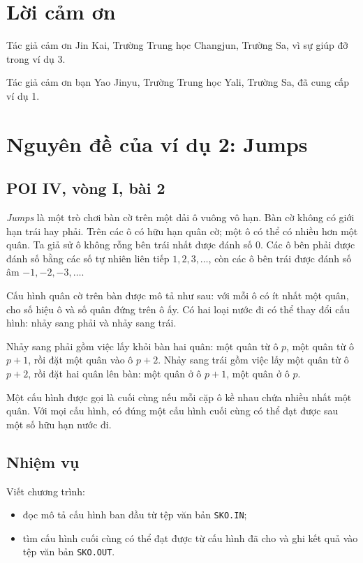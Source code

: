 \documentclass[11pt]{article}
\begin{document}
\section*{Lời cảm ơn}

Tác giả cảm ơn Jin Kai, Trường Trung học Changjun, Trường Sa, vì sự giúp đỡ
trong ví dụ 3.

Tác giả cảm ơn bạn Yao Jinyu, Trường Trung học Yali, Trường Sa, đã cung cấp
ví dụ 1.

\appendix
\section{Nguyên đề của ví dụ 2: Jumps}

\subsection*{POI IV, vòng I, bài 2}

\textit{Jumps} là một trò chơi bàn cờ trên một dải ô vuông vô hạn. Bàn cờ
không có giới hạn trái hay phải. Trên các ô có hữu hạn quân cờ; một ô có thể
có nhiều hơn một quân. Ta giả sử ô không rỗng bên trái nhất được đánh số
\(0\). Các ô bên phải được đánh số bằng các số tự nhiên liên tiếp
\(1,2,3,\ldots\), còn các ô bên trái được đánh số âm
\(-1,-2,-3,\ldots\).

Cấu hình quân cờ trên bàn được mô tả như sau: với mỗi ô có ít nhất một quân,
cho số hiệu ô và số quân đứng trên ô ấy. Có hai loại nước đi có thể thay đổi
cấu hình: nhảy sang phải và nhảy sang trái.

Nhảy sang phải gồm việc lấy khỏi bàn hai quân: một quân từ ô \(p\), một quân
từ ô \(p+1\), rồi đặt một quân vào ô \(p+2\). Nhảy sang trái gồm việc lấy một
quân từ ô \(p+2\), rồi đặt hai quân lên bàn: một quân ở ô \(p+1\), một quân ở
ô \(p\).

Một cấu hình được gọi là cuối cùng nếu mỗi cặp ô kề nhau chứa nhiều nhất một
quân. Với mọi cấu hình, có đúng một cấu hình cuối cùng có thể đạt được sau một
số hữu hạn nước đi.

\subsection*{Nhiệm vụ}

Viết chương trình:
\begin{itemize}
  \item đọc mô tả cấu hình ban đầu từ tệp văn bản \texttt{SKO.IN};
  \item tìm cấu hình cuối cùng có thể đạt được từ cấu hình đã cho và ghi kết
  quả vào tệp văn bản \texttt{SKO.OUT}.
\end{itemize}
\end{document}
